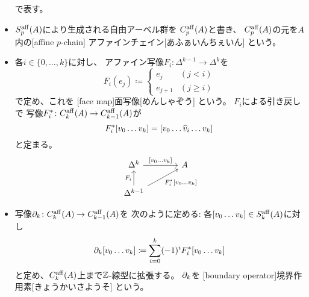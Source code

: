 \documentclass[report]{jlreq}
\begin{document}
\begin{definition}[アファイン単体]
\begin{itemize}
            で表す。
        \item $S_p^{\mathrm{aff}}(A)$により生成される自由アーベル群を
            $C_p^{\mathrm{aff}}(A)$と書き、
            $C_p^{\mathrm{aff}}(A)$の元を$A$内の[affine $p$-chain]
            {アファインチェイン}[あふぁいんちぇいん]
            という。
        \item 各$i \in \{0, \dots, k\}$に対し、
            アファイン写像$F_i \colon \Delta^{k - 1} \to \Delta^{k}$を
            \begin{equation}
                F_i(e_j) \coloneqq \begin{cases}
                    e_j & (j < i) \\
                    e_{j + 1} & (j \ge i)
                \end{cases}
            \end{equation}
            で定め、これを
            [face map]{面写像}[めんしゃぞう]
            という。
            $F_i$による引き戻しで
            写像$F_i^* \colon C_k^{\mathrm{aff}}(A) \to C_{k - 1}^{\mathrm{aff}}(A)$が
            \begin{equation}
                F_i^* [v_0 \dots v_k]
                    = [
                        v_0
                        \dots
                        \widehat{v}_i
                        \dots
                        v_k
                    ]
            \end{equation}
            と定まる。
            \begin{equation}
                \begin{tikzcd}[column sep=large]
                    \Delta^k
                        \ar{r}{[v_0 \dots v_k]}
                        & A \\
                    \Delta^{k - 1}
                        \ar{u}{F_i}
                        \ar{ru}[swap]{F_i^* [v_0 \dots v_k]}
                \end{tikzcd}
            \end{equation}
        \item 写像$\partial_k \colon C_k^{\mathrm{aff}}(A) \to C_{k - 1}^{\mathrm{aff}}(A)$を
            次のように定める:
            各$[v_0 \dots v_k] \in S_k^{\mathrm{aff}}(A)$に対し
            \begin{equation}
                \partial_k [v_0 \dots v_k]
                    \coloneqq \sum_{i = 0}^k (-1)^i F_i^* [v_0 \dots v_k]
            \end{equation}
            と定め、$C_k^{\mathrm{aff}}(A)$上まで$\mathbb{Z}$-線型に拡張する。
            $\partial_k$を
            [boundary operator]{境界作用素}[きょうかいさようそ]
            という。
    \end{itemize}
\end{definition}
\end{document}
